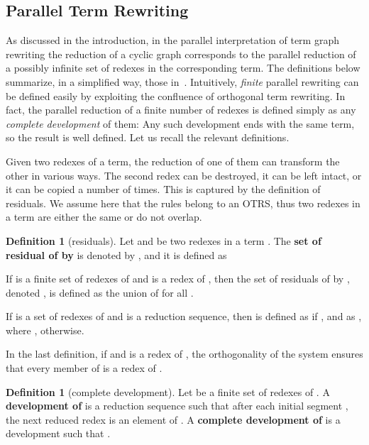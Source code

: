 \documentclass{eptcs}
\theoremstyle{plain}
\theoremstyle{definition}
\newtheorem{definition}[theorem]{Definition}
\begin{document}
\subsection{Parallel Term Rewriting}

As discussed in the introduction, in the parallel interpretation of
term graph rewriting the reduction of a cyclic graph corresponds to 
the parallel reduction of a possibly infinite set of redexes 
in the corresponding term. 
The definitions below summarize, in a simplified way, those in~\cite{Cor:TRC}.
Intuitively, {\em finite} parallel rewriting can be defined easily by 
exploiting the confluence of orthogonal term rewriting. In fact, 
the parallel reduction of a finite number of redexes is defined simply 
as any 
{\em complete development} of them: Any such development ends with the 
same term, so the result is well defined. Let us recall the relevant 
definitions.
  
Given two redexes of a term, the reduction of one of them can 
transform 
the other in various ways. 
The second redex can be destroyed, it can be left intact, or it can be 
copied a 
number of times. This is captured by the definition of residuals. We 
assume here that the rules belong to an OTRS, thus two redexes in a 
term 
are either the same or do not overlap. 

\begin{definition}[residuals]
\label{de:residuals}
Let  and  be 
two redexes in a term . The {\bf set of residual of 
 by } is denoted by , and 
it is defined as



\noindent
If  is a finite set of redexes of  and  is a redex of 
, then the set of residuals of  by , denoted , is defined as the union of 
 for all .

If  is a set of redexes of  and  is a reduction sequence, then  is defined as  if , and as , where , otherwise.
\end{definition}

In the last definition, if  and  is 
a 
redex of , the orthogonality of the system ensures that every 
member 
of  is a redex of .



\begin{definition}[complete development]
Let  be a finite set of redexes of . A {\bf development of 
} is 
a 
reduction sequence such that after each initial segment , the next 
reduced redex is an element of . A {\bf complete 
development of } is a development  such that .
\end{definition}
\end{document}
